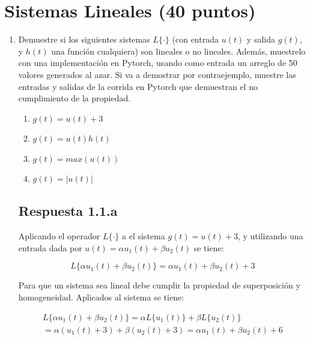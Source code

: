 \documentclass[12 pt]{article}
\begin{document}
\section{Sistemas Lineales (40 puntos)}

\begin{enumerate}
    
\item Demuestre si los siguientes sistemas ${L\{ \cdot \}}$ (con entrada ${u(t)}$ y salida ${g(t)}$, y ${h(t)}$ una función cualquiera) son lineales o no lineales. Además, muestrelo con una implementación en Pytorch, usando como entrada un arreglo de 50 valores generados al azar. Si va a demostrar por contraejemplo, muestre las entradas y salidas de la corrida en Pytorch que demuestran el no cumplimiento de la propiedad.

\begin{enumerate}
    \item ${g(t)=u(t)+3}$
    \item ${g(t)=u(t)h(t)}$ 
    \item ${g(t)=max(u(t))}$
    \item ${g(t)=|u(t)|}$
\end{enumerate}

\subsection{Respuesta 1.1.a}
\label{1pA}

Aplicando el operador ${L\{ \cdot \}}$ a el sistema ${g(t)=u(t)+3}$, y utilizando una entrada dada por ${u(t)=\alpha u_{1}(t) + \beta u_{2}(t)}$ se tiene:

\begin{equation}
\label{sist1a1}
    L\{ \alpha u_{1}(t) + \beta u_{2}(t) \} = \alpha u_{1}(t) + \beta u_{2}(t) + 3 
\end{equation}

Para que un sistema sea lineal debe cumplir la propiedad de superposición y homogeneidad. Aplicados al sistema se tiene:

\begin{center}
\begin{equation} \label{sist1a2}
\begin{split}
 L\{ \alpha u_{1}(t) + \beta u_{2}(t) \} = \alpha L\{ u_{1}(t) \} + \beta L\{ u_{2}(t) \} \\
 = \alpha (u_{1}(t)+3) + \beta (u_{2}(t)+3) = \alpha u_{1}(t) + \beta u_{2}(t) + 6
\end{split}
\end{equation}
\end{center}


\end{enumerate}
\end{document}

